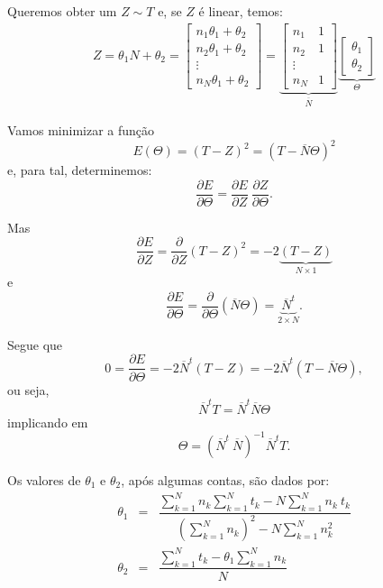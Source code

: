 {Queremos obter um \(Z \sim T\) e, se \(Z\) é linear, temos:
\begin{eqnarray*}
Z
= \theta_1 N + \theta_2 
= \left[\begin{array}{c} n_1\theta_1+\theta_2 \\ n_2\theta_1+\theta_2 \\ \vdots \\ n_N\theta_1+\theta_2 \end{array}\right] 
= \underbrace{\left[\begin{array}{cc} n_1 & 1 \\ n_2 & 1 \\ \vdots \\ n_N & 1 \end{array}\right]}_{\overline{N}}
\underbrace{\left[\begin{array}{c} \theta_1 \\ \theta_2 \end{array}\right]}_{\Theta}
\end{eqnarray*}

Vamos minimizar a função
\[E(\Theta)
= (T-Z)^2 = (T-\overline{N}\Theta)^2
\]
e, para tal, determinemos:
\[
\dfrac{\partial E}{\partial \Theta}
= \dfrac{\partial E}{\partial Z}\ \dfrac{\partial Z}{\partial \Theta}.\]

Mas
\[
\dfrac{\partial E}{\partial Z}
= \dfrac{\partial}{\partial Z} (T-Z)^2 = -2 \underbrace{(T-Z)}_{N \times 1}
\]
e
\[
\dfrac{\partial E}{\partial \Theta}
= \dfrac{\partial}{\partial \Theta} (\overline{N}\Theta) =  \underbrace{\overline{N}^t}_{2 \times N}.
\]

Segue que
\[0
= \dfrac{\partial E}{\partial \Theta}
= -2 \overline{N}^t (T-Z)
= -2 \overline{N}^t (T-\overline{N}\Theta),
\]
ou seja,
\[
\overline{N}^t T = \overline{N}^t \overline{N} \Theta
\]
implicando em
\[
\Theta = (\overline{N}^t\ \overline{N})^{-1} \overline{N}^t T.
\]


Os valores de \(\theta_1\) e \(\theta_2\), após algumas contas, são dados por:
\[\begin{array}{rcl}
\theta_1 &=& \dfrac{\displaystyle\sum_{k=1}^{N} n_{k} \sum_{k=1}^{N} t_{k} - N \sum_{k=1}^{N} n_{k}\ t_{k}}{\displaystyle\left(\sum_{k=1}^{N} n_{k}\right)^2 - N \sum_{k=1}^{N} n_{k}^2} \\
\theta_2 &=& \dfrac{\displaystyle\sum_{k=1}^{N} t_{k} - \theta_1 \sum_{k=1}^{N} n_{k}}{N}
\end{array}
\]

}
